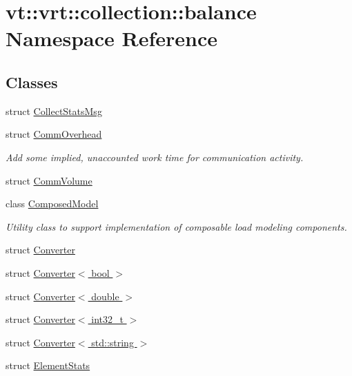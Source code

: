 \hypertarget{namespacevt_1_1vrt_1_1collection_1_1balance}{}\section{vt\+:\+:vrt\+:\+:collection\+:\+:balance Namespace Reference}
\label{namespacevt_1_1vrt_1_1collection_1_1balance}
\subsection*{Classes}
\begin{DoxyCompactItemize}
\item 
struct \hyperlink{structvt_1_1vrt_1_1collection_1_1balance_1_1_collect_stats_msg}{Collect\+Stats\+Msg}
\item 
struct \hyperlink{structvt_1_1vrt_1_1collection_1_1balance_1_1_comm_overhead}{Comm\+Overhead}
\begin{DoxyCompactList}\small\item\em Add some implied, unaccounted work time for communication activity. \end{DoxyCompactList}\item 
struct \hyperlink{structvt_1_1vrt_1_1collection_1_1balance_1_1_comm_volume}{Comm\+Volume}
\item 
class \hyperlink{classvt_1_1vrt_1_1collection_1_1balance_1_1_composed_model}{Composed\+Model}
\begin{DoxyCompactList}\small\item\em Utility class to support implementation of composable load modeling components. \end{DoxyCompactList}\item 
struct \hyperlink{structvt_1_1vrt_1_1collection_1_1balance_1_1_converter}{Converter}
\item 
struct \hyperlink{structvt_1_1vrt_1_1collection_1_1balance_1_1_converter_3_01bool_01_4}{Converter$<$ bool $>$}
\item 
struct \hyperlink{structvt_1_1vrt_1_1collection_1_1balance_1_1_converter_3_01double_01_4}{Converter$<$ double $>$}
\item 
struct \hyperlink{structvt_1_1vrt_1_1collection_1_1balance_1_1_converter_3_01int32__t_01_4}{Converter$<$ int32\+\_\+t $>$}
\item 
struct \hyperlink{structvt_1_1vrt_1_1collection_1_1balance_1_1_converter_3_01std_1_1string_01_4}{Converter$<$ std\+::string $>$}
\item 
struct \hyperlink{structvt_1_1vrt_1_1collection_1_1balance_1_1_element_stats}{Element\+Stats}

\end{DoxyCompactItemize}
